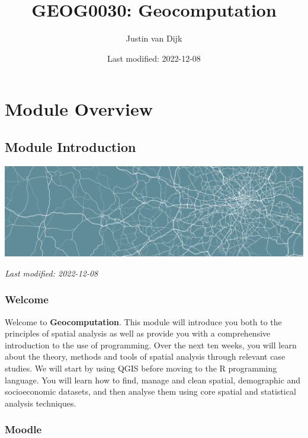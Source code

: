 \documentclass[
]{book}
\title{GEOG0030: Geocomputation}
\author{Justin van Dijk}
\date{Last modified: 2022-12-08}
\begin{document}
\maketitle

{
\setcounter{tocdepth}{1}
\tableofcontents
}
\hypertarget{part-module-overview}{%
\part*{Module Overview}\label{part-module-overview}}

\hypertarget{module-introduction}{%
\chapter*{Module Introduction}\label{module-introduction}}

\begin{center}\includegraphics[width=1\linewidth]{images/general/geocomputation_welcome} \end{center}

\emph{Last modified: 2022-12-08}

\hypertarget{welcome}{%
\section*{Welcome}\label{welcome}}

Welcome to \textbf{Geocomputation}. This module will introduce you both to the principles of spatial analysis as well as provide you with a comprehensive introduction to the use of programming. Over the next ten weeks, you will learn about the theory, methods and tools of spatial analysis through relevant case studies. We will start by using QGIS before moving to the R programming language. You will learn how to find, manage and clean spatial, demographic and socioeconomic datasets, and then analyse them using core spatial and statistical analysis techniques.

\hypertarget{moodle}{%
\section*{Moodle}\label{moodle}}
\end{document}
